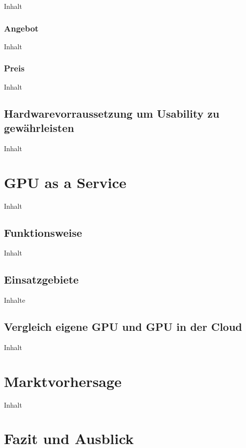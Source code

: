 \documentclass[12pt,toc=bib,toc=listof]{scrreprt}
\begin{document}
Inhalt

\subsection{Angebot}
\label{sec:Angebot}

Inhalt

\subsection{Preis}
\label{sec:Preis}

Inhalt

\section{Hardwarevorraussetzung um Usability zu gewährleisten}
\label{sec:Hardwarevorraussetzung um Usability zu gewährleisten}

Inhalt

\chapter{GPU as a Service}
\label{sec:GPU as a Service}

Inhalt

\section{Funktionsweise}
\label{sec: Funktionsweise}

Inhalt

\section{Einsatzgebiete}
\label{sec: Einsatzgebiete}

Inhalte

\section{Vergleich eigene GPU und GPU in der Cloud}
\label{sec:Vergleich eigene GPU und GPU in der Cloud}

Inhalt

\chapter{Marktvorhersage}
\label{sec:Marktvorhersage}

Inhalt

\chapter{Fazit und Ausblick} %
\label{sec:fazit}
\end{document}
